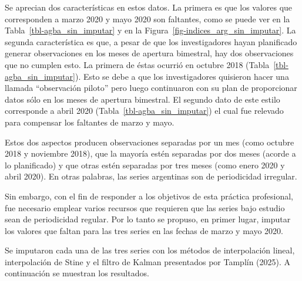 \documentclass[12pt]{article}
\begin{document}
Se aprecian dos características en estos datos. La primera es que los
valores que corresponden a marzo 2020 y mayo 2020 son faltantes, como se
puede ver en la Tabla~\ref{tbl-agba_sin_imputar} y en la
Figura~\ref{fig-indices_arg_sin_imputar}. La segunda característica es
que, a pesar de que los investigadores hayan planificado generar
observaciones en los meses de apertura bimestral, hay dos observaciones
que no cumplen esto. La primera de éstas ocurrió en octubre 2018
(Tabla~\ref{tbl-agba_sin_imputar}). Esto se debe a que los
investigadores quisieron hacer una llamada ``observación piloto'' pero
luego continuaron con su plan de proporcionar datos sólo en los meses de
apertura bimestral. El segundo dato de este estilo corresponde a abril
2020 (Tabla~\ref{tbl-agba_sin_imputar}) el cual fue relevado para
compensar los faltantes de marzo y mayo.

Estos dos aspectos producen observaciones separadas por un mes (como
octubre 2018 y noviembre 2018), que la mayoría estén separadas por dos
meses (acorde a lo planificado) y que otras estén separadas por tres
meses (como enero 2020 y abril 2020). En otras palabras, las series
argentinas son de periodicidad irregular.

Sin embargo, con el fin de responder a los objetivos de esta práctica
profesional, fue necesario emplear varios recursos que requieren que las
series bajo estudio sean de periodicidad regular. Por lo tanto se
propuso, en primer lugar, imputar los valores que faltan para las tres
series en las fechas de marzo y mayo 2020.

Se imputaron cada una de las tres series con los métodos de
interpolación lineal, interpolación de Stine y el filtro de Kalman
presentados por Tamplín (2025). A continuación se muestran los
resultados.
\end{document}
